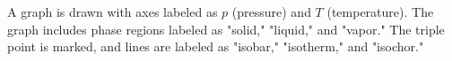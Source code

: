 A graph is drawn with axes labeled as \( p \) (pressure) and \( T \) (temperature). The graph includes phase regions labeled as "solid," "liquid," and "vapor." The triple point is marked, and lines are labeled as "isobar," "isotherm," and "isochor."